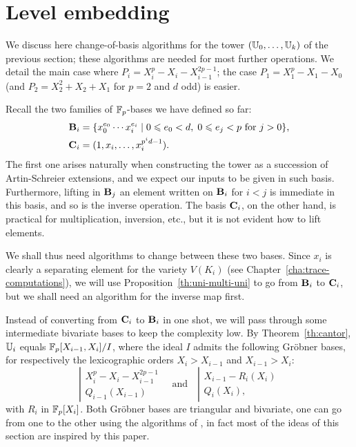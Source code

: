 \section{Level embedding}
\label{sec:level-embedding}

We discuss here change-of-basis algorithms for the tower $(\mathbb{U}_0,
\ldots, \mathbb{U}_k)$ of the previous section; these algorithms are needed
for most further operations. We detail the main case where $P_i =
X_i^p - X_i - X_{i-1}^{2p-1}$; the case $P_1= X_1^p - X_1 - X_0$ (and
$P_2=X_2^2+X_2+X_1$ for $p=2$ and $d$ odd) is easier.

Recall the two families of $\mathbb{F}_p$-bases we have defined so far:
\begin{align}
  \label{eq:58}
  \mathbf{B}_i &=
  \{x_0^{e_0} \cdots x_i^{e_i} \;|\; 0 \leqslant e_0 < d,\; 0\leqslant e_j < p 
  \text{ for $j>0$}\}
  \text{,}\\
  \label{eq:60}
  \mathbf{C}_i &=(1,x_i,\dots,x_i^{p^id-1})
  \text{.}  
\end{align}
The first one arises naturally when constructing the tower as a
succession of Artin-Schreier extensions, and we expect our inputs to
be given in such basis. Furthermore, lifting in $\mathbf{B}_j$ an
element written on $\mathbf{B}_i$ for $i<j$ is immediate in this basis,
and so is the inverse operation. The basis $\mathbf{C}_i$, on the
other hand, is practical for multiplication, inversion, etc., but it
is not evident how to lift elements.

We shall thus need algorithms to change between these two bases. Since
$x_i$ is clearly a separating element for the variety $V(K_i)$ (see
Chapter~\ref{cha:trace-computations}), we will use
Proposition~\ref{th:uni-multi-uni} to go from $\mathbf{B}_i$ to
$\mathbf{C}_i$, but we shall need an algorithm for the inverse map first.

Instead of converting from $\mathbf{C}_i$ to $\mathbf{B}_i$ in one shot,
we will pass through some intermediate bivariate bases to keep the
complexity low. By Theorem~\ref{th:cantor}, $\mathbb{U}_i$ equals
$\mathbb{F}_p[X_{i-1},X_i]/I$, where the ideal $I$ admits the following
Gr{\"o}bner bases, for respectively the lexicographic orders
$X_i>X_{i-1}$ and $X_{i-1}>X_i$:
\begin{equation}
  \left |
  \begin{array}{rl}
    X_i^p - X_i - X_{i-1}^{2p-1} \\
    Q_{i-1}(X_{i-1})         
  \end{array}
\right.
  \quad \text{and}\quad
  \left |
  \begin{array}{rl}
    X_{i-1} - R_i(X_i) \\
    Q_i(X_i),
  \end{array}
\right.
\end{equation}
with $R_i$ in $\mathbb{F}_p[X_i]$. Both Gröbner bases are triangular and
bivariate, one can go from one to the other using the algorithms of
\cite{pascal+schost06}, in fact most of the ideas of this section are
inspired by this paper.

